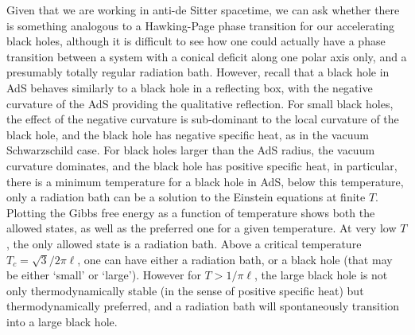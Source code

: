 \documentclass[
twoside,
openright,
frontopenright,
]{dmathesis}
\begin{document}
Given that we are working in anti-de Sitter spacetime, we can ask whether there
is something analogous to a Hawking-Page phase transition \cite{Hawking:1982dh}
for our accelerating black holes, although it is difficult to see how one could
actually have a phase transition between a system with a conical deficit along
one polar axis only, and a presumably totally regular radiation bath.  However,
recall that a black hole in AdS behaves similarly to a black hole in a
reflecting box, with the negative curvature of the AdS providing the qualitative
reflection. For small black holes, the effect of the negative curvature is
sub-dominant to the local curvature of the black hole, and the black hole has
negative specific heat, as in the vacuum Schwarzschild case. For black holes
larger than the AdS radius, the vacuum curvature dominates, and the black hole
has positive specific heat, in particular, there is a minimum temperature for a
black hole in AdS, below this temperature, only a radiation bath can be a
solution to the Einstein equations at finite $T$. Plotting the Gibbs free energy
as a function of temperature shows both the allowed states, as well as the
preferred one for a given temperature.  At very low $T$, the only allowed state
is a radiation bath. Above a critical temperature $T_c = \sqrt{3}/2\pi\ell$, one
can have either a radiation bath, or a black hole (that may be either `small' or
`large'). However for $T>1/\pi\ell$, the large black hole is not only
thermodynamically stable (in the sense of positive specific heat) but
thermodynamically preferred, and a radiation bath will spontaneously transition
into a large black hole.
\end{document}
